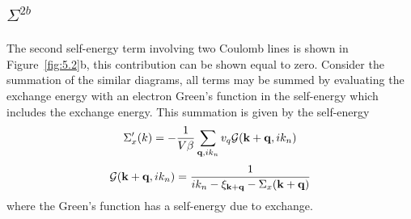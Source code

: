 \subsection{$\Sigma^{2b}$}
The second self-energy term involving two Coulomb lines is shown in Figure~\ref{fig:5.2}b, this contribution can be shown equal to zero.
Consider the summation of the similar diagrams, all terms may be summed by evaluating the exchange energy with an electron Green's function in the self-energy which includes the exchange energy.
This summation is given by the self-energy
\begin{equation}
    \Sigma'_x(k) = - \frac{1}{V\beta} \sum_{\mathbf{q},ik_n} v_q \mathcal{G}(\mathbf{k}+\mathbf{q},ik_n) \label{5.47}
\end{equation}
\begin{equation}
    \mathcal{G} (\mathbf{k}+\mathbf{q},ik_n) = \frac{1}{ik_n - \xi_{\mathbf{k}+\mathbf{q}} -\Sigma_x(\mathbf{k}+\mathbf{q})} \label{5.48}
\end{equation}
where the Green's function has a self-energy due to exchange.
